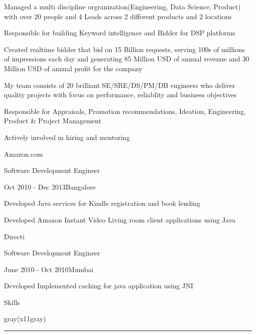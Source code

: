 \documentclass[8pt,a4paper]{article}
\begin{document}
\begin{multicols}{2}
\begin{desc}{Managed a multi discipline orgranization(Engineering, Data Science, Product) with over 20 people and 4 Leads across 2 different products and 2 locations}
\end{desc}
\begin{desc}{Responsible for building Keyword intelligence and Bidder for DSP platforms}
\end{desc}
\begin{desc}{Created realtime bidder that bid on 15 Billion requests, serving 100s of millions of impressions each day and generating 85 Million USD of annual revenue and 30 Million USD of annual profit for the company}
\end{desc}
\begin{desc}{My team consists of 20 brilliant SE/SRE/DS/PM/DB engineers who deliver quality projects with focus on performance, reliablity and business objectives}
\end{desc}
\begin{desc}{Responsible for Appraisals, Promotion recommendations, Ideation, Engineering, Product \& Project Management}
\end{desc}
\begin{desc}{Actively involved in hiring and mentoring}
\end{desc}
\begin{expsec}{Amazon.com}
\end{expsec}
\begin{expsubsec}{Software Development Engineer}
\end{expsubsec}
\begin{timeandlocation}Oct 2010 - Dec 2013{\textbar}Bangalore
\end{timeandlocation}
\begin{desc}{Developed Java services for Kindle registration and book lending}
\end{desc}
\begin{desc}{Developed Amazon Instant Video Living room client applications using Java}
\end{desc}
\begin{expsec}{Directi}
\end{expsec}
\begin{expsubsec}{Software Development Engineer}
\end{expsubsec}
\begin{timeandlocation}June 2010 - Oct 2010{\textbar}Mumbai
\end{timeandlocation}
\begin{desc}{Developed Implemented caching for java application using JNI}
\end{desc}
\vspace{4mm}
\begin{section}{Skills}
\end{section}
\begin{color}{gray(x11gray)}\hrule\end{color}
\vspace{5mm}

\end{multicols}
\end{document}
